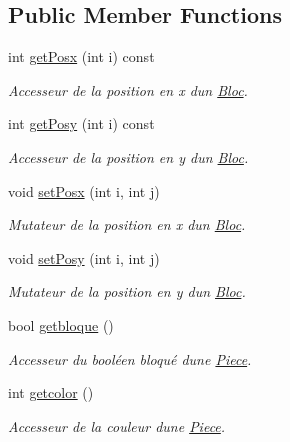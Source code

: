 \subsection*{Public Member Functions}
\begin{DoxyCompactItemize}
\item 
int \hyperlink{classPiece_a0af5276d26a4bb2a6a42a3dab8b4783f}{get\+Posx} (int i) const
\begin{DoxyCompactList}\small\item\em Accesseur de la position en x d\textquotesingle{}un \hyperlink{classBloc}{Bloc}. \end{DoxyCompactList}\item 
int \hyperlink{classPiece_a24ca14604d394b821bf89d690c6de477}{get\+Posy} (int i) const
\begin{DoxyCompactList}\small\item\em Accesseur de la position en y d\textquotesingle{}un \hyperlink{classBloc}{Bloc}. \end{DoxyCompactList}\item 
void \hyperlink{classPiece_a2c6f76d78f5c448ba42b11f0b2af12f8}{set\+Posx} (int i, int j)
\begin{DoxyCompactList}\small\item\em Mutateur de la position en x d\textquotesingle{}un \hyperlink{classBloc}{Bloc}. \end{DoxyCompactList}\item 
void \hyperlink{classPiece_a53af32e68bb73e5ed23f3ac96a9d1516}{set\+Posy} (int i, int j)
\begin{DoxyCompactList}\small\item\em Mutateur de la position en y d\textquotesingle{}un \hyperlink{classBloc}{Bloc}. \end{DoxyCompactList}\item 
bool \hyperlink{classPiece_aa5f13b2ce17fdf29dca28b0455f7b73a}{getbloque} ()
\begin{DoxyCompactList}\small\item\em Accesseur du booléen bloqué d\textquotesingle{}une \hyperlink{classPiece}{Piece}. \end{DoxyCompactList}\item 
int \hyperlink{classPiece_a2160d48bd04821ebbab32e14728360ad}{getcolor} ()
\begin{DoxyCompactList}\small\item\em Accesseur de la couleur d\textquotesingle{}une \hyperlink{classPiece}{Piece}. \end{DoxyCompactList}\item 

\end{DoxyCompactItemize}
